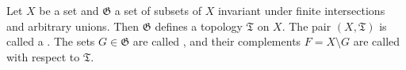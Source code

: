Let $X$ be a set and $\mathfrak{G}$ a set of subsets of $X$ invariant under finite intersections and arbitrary unions. Then $\mathfrak{G}$ defines a topology $\mathfrak{T}$ on $X$. The pair $(X, \mathfrak{T})$ is called a . The sets $G \in \mathfrak{G}$ are called , and their complements $F = X \setminus G$ are called  with respect to $\mathfrak{T}$.
